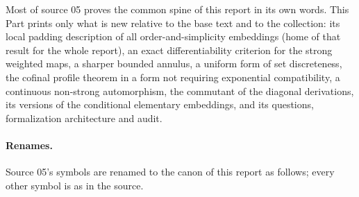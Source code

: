 \documentclass[11pt,a4paper]{article}
\numberwithin{equation}{section}
\theoremstyle{plain}
\theoremstyle{definition}
\theoremstyle{remark}
\begin{document}
Most of source 05 proves the common spine of this report in its own words.
This Part prints only what is new relative to the base text and to the
collection: its local padding description of all order-and-simplicity
embeddings (home of that result for the whole report), an exact
differentiability criterion for the strong weighted maps, a sharper bounded
annulus, a uniform form of set discreteness, the cofinal profile theorem in
a form not requiring exponential compatibility, a continuous non-strong
automorphism, the commutant of the diagonal derivations, its versions of the
conditional elementary embeddings, and its questions, formalization
architecture and audit.

\paragraph{Renames.} Source 05's symbols are renamed to the canon of this
report as follows; every other symbol is as in the source.
\end{document}
